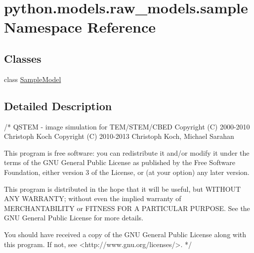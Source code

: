 \hypertarget{namespacepython_1_1models_1_1raw__models_1_1sample}{\section{python.\-models.\-raw\-\_\-models.\-sample Namespace Reference}
\label{namespacepython_1_1models_1_1raw__models_1_1sample}
}
\subsection*{Classes}
\begin{DoxyCompactItemize}
\item 
class \hyperlink{classpython_1_1models_1_1raw__models_1_1sample_1_1_sample_model}{Sample\-Model}
\end{DoxyCompactItemize}


\subsection{Detailed Description}
\begin{DoxyVerb}/*
QSTEM - image simulation for TEM/STEM/CBED
    Copyright (C) 2000-2010  Christoph Koch
    Copyright (C) 2010-2013  Christoph Koch, Michael Sarahan

    This program is free software: you can redistribute it and/or modify
    it under the terms of the GNU General Public License as published by
    the Free Software Foundation, either version 3 of the License, or
    (at your option) any later version.

    This program is distributed in the hope that it will be useful,
    but WITHOUT ANY WARRANTY; without even the implied warranty of
    MERCHANTABILITY or FITNESS FOR A PARTICULAR PURPOSE.  See the
    GNU General Public License for more details.

    You should have received a copy of the GNU General Public License
    along with this program.  If not, see <http://www.gnu.org/licenses/>.
*/
\end{DoxyVerb}
 